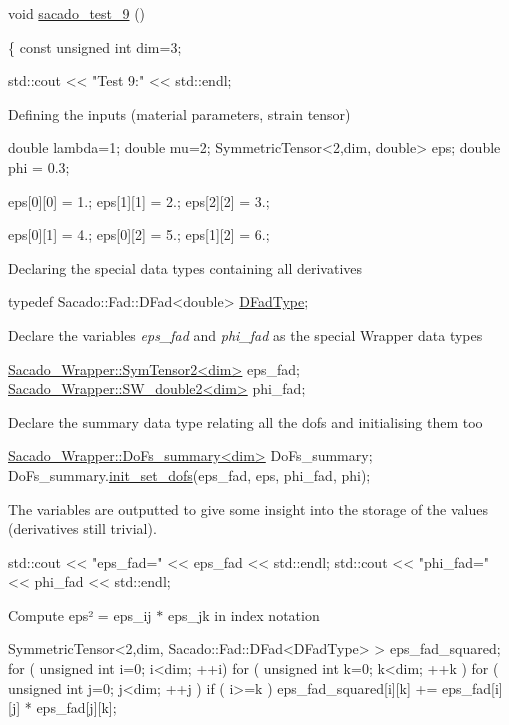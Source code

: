 \begin{DoxyCode}
\textcolor{keywordtype}{void} \hyperlink{Sacado__example_8cc_ae176f83fe1943e102fe325d4a14f097e}{sacado\_test\_9} ()
 
\{
    \textcolor{keyword}{const} \textcolor{keywordtype}{unsigned} \textcolor{keywordtype}{int} dim=3;
 
    std::cout << \textcolor{stringliteral}{"Test 9:"} << std::endl;
\end{DoxyCode}
 Defining the inputs (material parameters, strain tensor) 
\begin{DoxyCode}
\textcolor{keywordtype}{double} lambda=1;
\textcolor{keywordtype}{double} mu=2;
SymmetricTensor<2,dim, double> eps;
\textcolor{keywordtype}{double} phi = 0.3;

eps[0][0] = 1.;
eps[1][1] = 2.;
eps[2][2] = 3.;

eps[0][1] = 4.;
eps[0][2] = 5.;
eps[1][2] = 6.;
\end{DoxyCode}
 Declaring the special data types containing all derivatives 
\begin{DoxyCode}
\textcolor{keyword}{typedef} Sacado::Fad::DFad<double> \hyperlink{Sacado__Wrapper_8h_a7e0893207b87dad05c66a34baac8ed2e}{DFadType};
\end{DoxyCode}
 Declare the variables {\itshape eps\+\_\+fad} and {\itshape phi\+\_\+fad} as the special Wrapper data types 
\begin{DoxyCode}
\hyperlink{classSacado__Wrapper_1_1SymTensor2}{Sacado\_Wrapper::SymTensor2<dim>} eps\_fad;
\hyperlink{classSacado__Wrapper_1_1SW__double2}{Sacado\_Wrapper::SW\_double2<dim>} phi\_fad;
\end{DoxyCode}
 Declare the summary data type relating all the dofs and initialising them too 
\begin{DoxyCode}
\hyperlink{classSacado__Wrapper_1_1DoFs__summary}{Sacado\_Wrapper::DoFs\_summary<dim>} DoFs\_summary;
DoFs\_summary.\hyperlink{classSacado__Wrapper_1_1DoFs__summary_ae273d0fa3197118a11d7005523e27d8a}{init\_set\_dofs}(eps\_fad, eps, phi\_fad, phi);
\end{DoxyCode}
 The variables are outputted to give some insight into the storage of the values (derivatives still trivial). 
\begin{DoxyCode}
std::cout << \textcolor{stringliteral}{"eps\_fad="} << eps\_fad << std::endl;
std::cout << \textcolor{stringliteral}{"phi\_fad="} << phi\_fad << std::endl;
\end{DoxyCode}
 Compute eps² = eps\+\_\+ij $\ast$ eps\+\_\+jk in index notation 
\begin{DoxyCode}
SymmetricTensor<2,dim, Sacado::Fad::DFad<DFadType> > eps\_fad\_squared;
\textcolor{keywordflow}{for} ( \textcolor{keywordtype}{unsigned} \textcolor{keywordtype}{int} i=0; i<dim; ++i)
   \textcolor{keywordflow}{for} ( \textcolor{keywordtype}{unsigned} \textcolor{keywordtype}{int} k=0; k<dim; ++k )
       \textcolor{keywordflow}{for} ( \textcolor{keywordtype}{unsigned} \textcolor{keywordtype}{int} j=0; j<dim; ++j )
           \textcolor{keywordflow}{if} ( i>=k )
               eps\_fad\_squared[i][k] += eps\_fad[i][j] * eps\_fad[j][k];
\end{DoxyCode}
